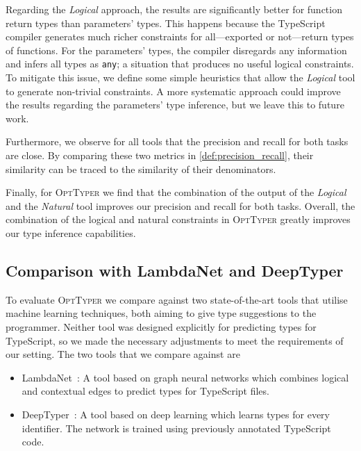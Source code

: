 \documentclass[acmsmall, review, anonymous]{acmart}\settopmatter{printfolios=true,printccs=false,printacmref=false}
\newcommand{\projectname}{\textsc{OptTyper}\xspace}
\begin{document}
Regarding the \textit{Logical} approach, the results are significantly better for function return types
than parameters' types.
This happens because the TypeScript compiler generates much richer constraints for all---exported or not---return
types of functions.
For the parameters' types, the compiler disregards any information
and infers all types as \texttt{any}; a situation that produces no useful logical constraints.
To mitigate this issue, we define some simple heuristics that allow the \textit{Logical} tool
to generate non-trivial constraints.
A more systematic approach could improve the results regarding the parameters' type inference,
but we leave this to future work.

Furthermore, we observe for all tools that the precision and recall for both tasks are close.
By comparing these two metrics in \cref{def:precision_recall},
their similarity can be traced to the similarity of their denominators.

Finally, for \projectname we find that the combination of the output of the \textit{Logical}
and the \textit{Natural} tool improves our precision and recall for both tasks.
Overall, the combination of the logical and natural constraints in \projectname
greatly improves our type inference capabilities.

\subsection{Comparison with LambdaNet and DeepTyper}
\label{ssec:typesubproblem}

To evaluate \projectname we compare against two state-of-the-art tools that utilise machine learning techniques,
both aiming to give type suggestions to the programmer.
Neither tool was designed explicitly for predicting types for TypeScript,
so we made the necessary adjustments to meet the requirements of our setting.
The two tools that we compare against are
\begin{itemize}[label={\tiny$\bullet$}]
    \item LambdaNet~\cite{wei20}: A tool based on graph neural networks which combines logical and contextual edges
	 to predict types for TypeScript files.
	\item DeepTyper~\cite{hellendoorn18}: A tool based on deep learning which learns types for every identifier.
	      The network is trained using previously annotated TypeScript code.
\end{itemize}
\end{document}
